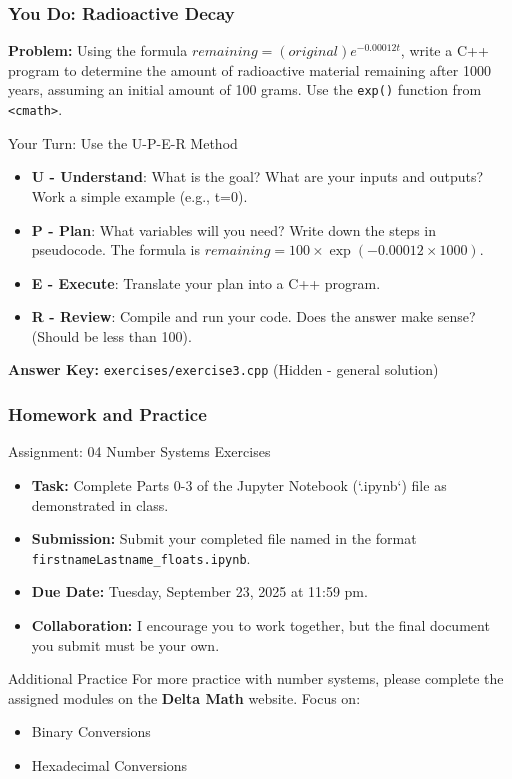 \documentclass{beamer}
\begin{document}
\begin{frame}
\frametitle{You Do: Radioactive Decay}
\textbf{Problem:} Using the formula $remaining = (original)e^{-0.00012t}$, write a C++ program to determine the amount of radioactive material remaining after \alert{1000 years}, assuming an initial amount of \alert{100 grams}. Use the \texttt{exp()} function from \texttt{<cmath>}.

\vfill

\begin{block}{Your Turn: Use the U-P-E-R Method}
\begin{itemize}
    \item \textbf{U - Understand}: What is the goal? What are your inputs and outputs? Work a simple example (e.g., t=0).
    \item \textbf{P - Plan}: What variables will you need? Write down the steps in pseudocode. The formula is $remaining = 100 \times \exp(-0.00012 \times 1000)$.
    \item \textbf{E - Execute}: Translate your plan into a C++ program.
    \item \textbf{R - Review}: Compile and run your code. Does the answer make sense? (Should be less than 100).
\end{itemize}
\end{block}
\vfill
\textbf{Answer Key:} \texttt{exercises/exercise3.cpp} (Hidden - general solution)
\end{frame}

\begin{frame}
\frametitle{Homework and Practice}

\begin{block}{Assignment: 04 Number Systems Exercises}
    \begin{itemize}
        \item \textbf{Task:} Complete Parts 0-3 of the Jupyter Notebook (`.ipynb`) file as demonstrated in class.
        \item \textbf{Submission:} Submit your completed file named in the format \alert{\texttt{firstnameLastname\_floats.ipynb}}.
        \item \textbf{Due Date:} \alert{Tuesday, September 23, 2025 at 11:59 pm}.
        \item \textbf{Collaboration:} I encourage you to work together, but the final document you submit must be your own.
    \end{itemize}
\end{block}

\vfill

\begin{alertblock}{Additional Practice}
For more practice with number systems, please complete the assigned modules on the \textbf{Delta Math} website. Focus on:
\begin{itemize}
    \item Binary Conversions
    \item Hexadecimal Conversions
\end{itemize}
\end{alertblock}

\end{frame}
\end{document}
